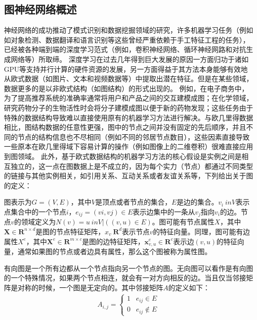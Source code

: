 \subsection{图神经网络概述}
神经网络的成功推动了模式识别和数据挖掘领域的研究，许多机器学习任务（例如如对象检测、数据翻译和语言识别等这些曾经严重依赖于手工特征工程的任务），已经被各种端到端的深度学习范式（例如，卷积神经网络、循环神经网路和对抗生成网络等）所取缔。
深度学习在过去几年得到巨大发展的原因一方面归功于诸如GPU等支持并行计算的硬件资源的发展，另一方面得益于其方法本身能够有效地从欧式数据（如图片、文本和视频数据等）中提取出潜在特征。但是在某些领域，数据更多的是以非欧式结构（如图结构）的形式出现的。
例如，在电子商务中，为了提高推荐系统的准确率通常将用户和产品之间的交互建模成图；在化学领域，研究药物分子的生物活性时会将分子建模成图以便于新的药物发现；这些任务由于特殊的数据结构导致难以直接使用原有的机器学习方法进行解决。与欧几里得数据相比，图结构数据的任意性更强，图中的节点之间并没有固定的先后顺序，并且不同的节点的结构信息也不尽相同（例如不同的邻居节点数目），这些因素直接导致一些原本在欧几里得域下容易计算的操作（例如图像上的二维卷积）很难直接应用到图领域。
此外，基于欧式数据结构的机器学习方法的核心假设是实例之间是相互独立的，这一点在图数据上是不成立的，因为每个实力（节点）都通过不同类型的链接与其他实例相关，如引用关系、互动关系或者友谊关系等，下列给出关于图的定义：
\begin{definition}[图]
\label{def:graph}
\end{definition}
图表示为$G=(V,E)$，其中$V$是顶点或者节点的集合，$E$是边的集合。$v_i \ in V$表示点集合中的一个节点$i$，$e_{ij}=(vi, vj) \in E$表示边集中的一条从$v_j$指向$v_i$的边。节点$v$的领域定义为$N(v)={u \ in V| ((v,u) \in E)}$。图可能有节点属性$X$，其中$\mathbf{X} \in \mathbf{R}^{n \times d}$是图的节点特征矩阵，$x_v \ \mathbf{R}^d$表示节点$v$的特征向量。同理，图可能有边属性$X^e$，其中$\mathbf{X}^{e} \in \mathbf{R}^{m \times c}$是图的边特征矩阵，$\mathbf{x}_{v, u}^{e} \in \mathbf{R}^{c}$表示边$(v,u)$的特征向量，通常如果图的节点或者边具有属性，那么这个图被称为属性图。

\begin{definition}[有向图]
\label{def:directed-graph}
有向图是一个所有边都从一个节点指向另一个节点的图。无向图可以看作是有向图的一个特殊情况，如果两个节点相连，就会有一对方向相反的边。当且仅当邻接矩阵是对称的时候，一个图是无定向的。其中邻接矩阵$A$的定义如下：
\begin{align}
    A_{i,j} = \begin{cases}
      1 & e_{ij} \in E \\
      0 & e_{ij} \notin E
    \end{cases}
  \end{align}
\end{definition}

